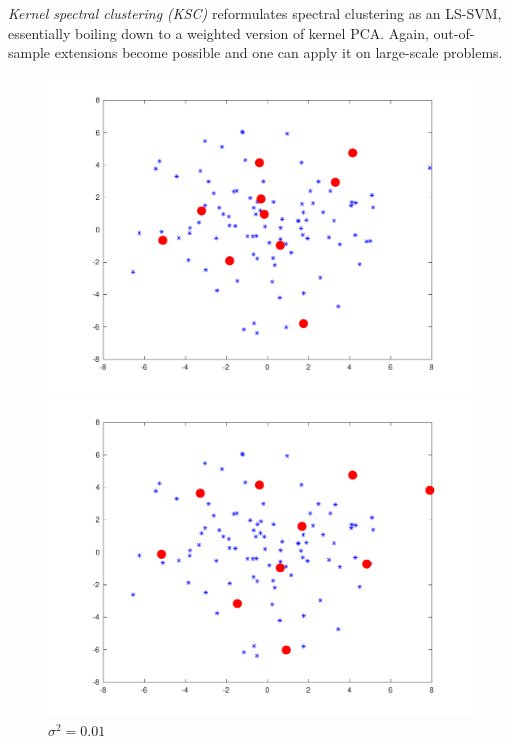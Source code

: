 \par \textit{Kernel spectral clustering (KSC)} reformulates spectral clustering as an LS-SVM, essentially boiling down to a weighted version of kernel PCA. Again, out-of-sample extensions become possible and one can apply it on large-scale problems. 

\begingroup
\setlength{\columnsep}{0.8cm}
\setlength{\intextsep}{0.5cm}
\begin{figure}
\vspace{-1.0cm}
\begin{minipage}{\linewidth}
    \centering\captionsetup[subfigure]{justification=centering}
    \includegraphics[width=\linewidth]{../src/figures/fixedsize/fixedsize_1}
    \caption*{$\sigma^2=0.01$}
\includegraphics[width=\linewidth]{../src/figures/fixedsize/fixedsize_10}

\end{minipage}
\end{figure}
